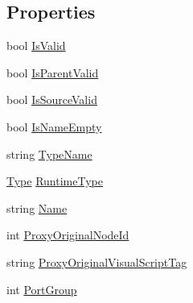 \subsection*{Properties}
\begin{DoxyCompactItemize}
\item 
bool \hyperlink{classi_c_s___engine_object_a8fe552c05ae20584fd407c30aa14929f}{Is\+Valid}
\item 
bool \hyperlink{classi_c_s___engine_object_a1e7c0aca435474537a8067ede1f25d89}{Is\+Parent\+Valid}
\item 
bool \hyperlink{classi_c_s___engine_object_aaf335379e5f30cba7a61edf9dfdba837}{Is\+Source\+Valid}
\item 
bool \hyperlink{classi_c_s___engine_object_a2ceb75035f670ac581cdf1125e0280c8}{Is\+Name\+Empty}
\item 
string \hyperlink{classi_c_s___engine_object_aba60f65a6177e5e1633e174faf281018}{Type\+Name}
\item 
\hyperlink{i_c_s___object_type_enum_8cs_ae6c3dd6d8597380b56d94908eb431547aa1fa27779242b4902f7ae3bdd5c6d508}{Type} \hyperlink{classi_c_s___engine_object_a20c206f166f53af218e7496308fb4320}{Runtime\+Type}
\item 
string \hyperlink{classi_c_s___engine_object_ae9494fcdc0253806e10e08f35d95d4fd}{Name}
\item 
int \hyperlink{classi_c_s___engine_object_ab00c906a6e6506ec14ae69d52f20cbf3}{Proxy\+Original\+Node\+Id}
\item 
string \hyperlink{classi_c_s___engine_object_a54b06d74fb658c51dbfe102b11c3a5d6}{Proxy\+Original\+Visual\+Script\+Tag}
\item 
int \hyperlink{classi_c_s___engine_object_a02df407bee98eb455f6f129d463afcca}{Port\+Group}

\end{DoxyCompactItemize}
